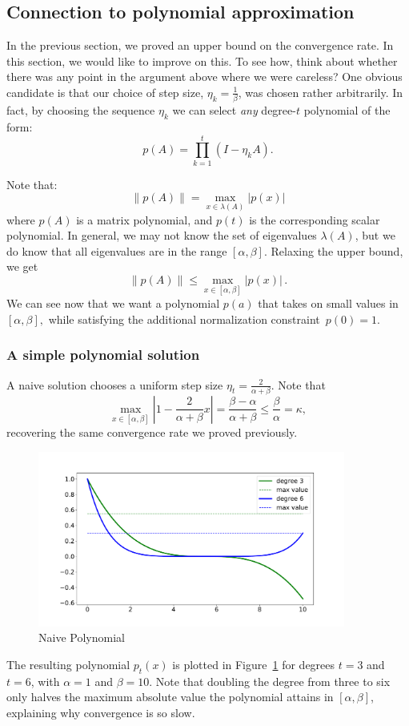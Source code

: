 \subsection{Connection to polynomial approximation}
In the previous section, we proved an upper bound on the convergence rate. In
this section, we would like to improve on this. To see how, think about 
whether there was any
point in the argument above where we were careless? One obvious candidate is that
our choice of step size, $\eta_k = \frac{1}{\beta}$, was chosen rather
arbitrarily. In fact, by choosing the sequence $\eta_k$ we can select
\textit{any} degree-$t$ polynomial of the form: 
\[
p(A) = \prod_{k=1}^t \left(I - \eta_k A\right).
\]

Note that:
\begin{equation*}
\left\|p(A)\right\| = \max_{x \in \lambda(A)} \left|p(x)\right|
\end{equation*}
where $p(A)$ is a matrix polynomial, and $p(t)$ is the corresponding scalar
polynomial. In general, we may not know the set of eigenvalues $\lambda(A)$, but
we do know that all eigenvalues are in the range $[\alpha, \beta].$ Relaxing
the upper bound, we get
\begin{equation*}
\left\|p(A)\right\| \le \max_{x \in [\alpha, \beta]} \left|p(x)\right|\,.
\end{equation*}
We can see now that we
want a polynomial $p(a)$ that takes on small values in $[\alpha, \beta],$ while 
satisfying the additional normalization constraint~$p(0) = 1.$ 

\subsubsection{A simple polynomial solution}
A naive solution chooses a uniform step size $\eta_t = \frac{2}{\alpha + \beta}$. Note that
\[
\max_{x \in [\alpha, \beta]} \left|1 - \frac{2}{\alpha + \beta} x\right| = \frac{\beta - \alpha}{\alpha + \beta} \leq \frac{\beta}{\alpha} = \kappa,
\]
recovering the same convergence rate we proved previously.
\begin{figure}[h]
\includegraphics[width=0.9\textwidth]{figures/lecture6-naive_polynome.pdf}
\centering
\caption{Naive Polynomial}
\label{naive_p}
\end{figure}
%
The resulting polynomial $p_t(x)$ is plotted in Figure~\ref{naive_p} for degrees
$t = 3$ and $t = 6$, with $\alpha = 1$ and $\beta = 10$. Note that doubling the
degree from three to six only halves the maximum absolute value the polynomial
attains in $[\alpha,\beta]$, explaining why convergence is so slow.

